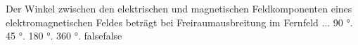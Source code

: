     {Der Winkel zwischen den elektrischen und magnetischen Feldkomponenten eines elektromagnetischen Feldes beträgt bei Freiraumausbreitung im Fernfeld ...}
    {90 °.}
    {45 °.}
    {180 °.}
    {360 °.}
    {false}{false}